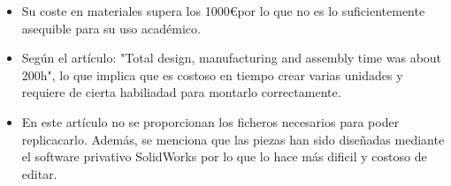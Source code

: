 \begin{itemize}
\begin{itemize}
        \item Su coste en materiales supera los 1000\euro  por lo que no es lo suficientemente asequible para su uso académico.
        \item Según el artículo: "Total design, manufacturing and assembly time was about 200h", lo que implica que es costoso en tiempo 
        crear varias unidades y requiere de cierta habiliadad para montarlo correctamente.
        \item En este artículo no se proporcionan los ficheros necesarios para poder replicacarlo. Además, se menciona que las piezas han sido 
        diseñadas mediante el software privativo SolidWorks\textsuperscript{\tiny\textregistered} por lo que lo hace más dificil y costoso de editar.
    \end{itemize}\
\end{itemize}\
\vspace{1cm}
